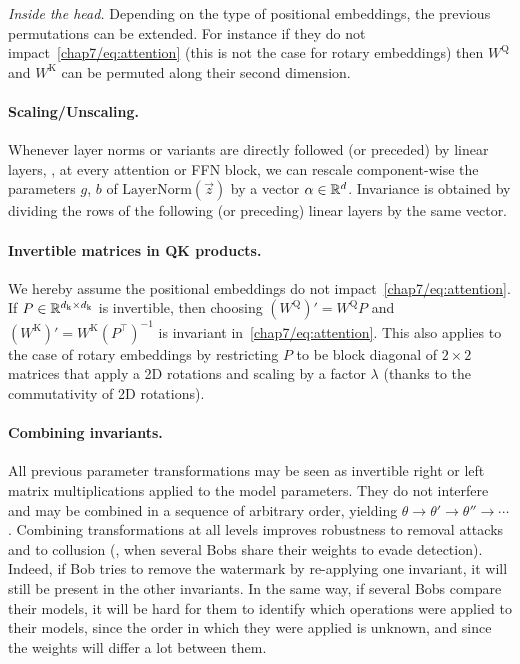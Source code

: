 \noindent
\emph{Inside the head.}
Depending on the type of positional embeddings, the previous permutations can be extended.
For instance if they do not impact~\eqref{chap7/eq:attention} (this is not the case for rotary embeddings) then $W^\mathrm{Q}$ and $W^\mathrm{K}$ can be permuted along their second dimension.

\paragraph*{Scaling/Unscaling.}\label{chap7/sec:scaling}
Whenever layer norms or variants are directly followed (or preceded) by linear layers, \eg, at every attention or FFN block, we can rescale component-wise the parameters $g$, $b$ of $\mathrm{LayerNorm}(\vec{z})$
by a vector $\alpha\in \mathbb{R}^d$.
Invariance is obtained by dividing the rows of the following (or preceding) linear layers by the same vector.

\paragraph*{Invertible matrices in QK products.}\label{chap7/sec:invertible}
We hereby assume the positional embeddings do not impact~\eqref{chap7/eq:attention}.
If $P \in \mathbb{R} ^{d_\mathrm{k}\times d_\mathrm{k}}$ is invertible, then choosing $(W^\mathrm{Q})' = W^\mathrm{Q} P$ and $(W^\mathrm{K})' = W^\mathrm{K} (P^\top)^{-1}$ is invariant in~\eqref{chap7/eq:attention}.
This also applies to the case of rotary embeddings by restricting $P$ to be block diagonal of $2\times 2$ matrices that apply a 2D rotations and scaling by a factor $\lambda$ (thanks to the commutativity of 2D rotations). 


\paragraph*{Combining invariants.}
All previous parameter transformations may be seen as invertible right or left matrix multiplications applied to the model parameters. 
They do not interfere and may be combined in a sequence of arbitrary order, yielding $\theta \rightarrow \theta' \rightarrow \theta'' \rightarrow \cdots$.
Combining transformations at all levels improves robustness to removal attacks and to collusion (\ie, when several Bobs share their weights to evade detection).
Indeed, if Bob tries to remove the watermark by re-applying one invariant, it will still be present in the other invariants.
In the same way, if several Bobs compare their models, it will be hard for them to identify which operations were applied to their models, since the order in which they were applied is unknown, and since the weights will differ a lot between them.

